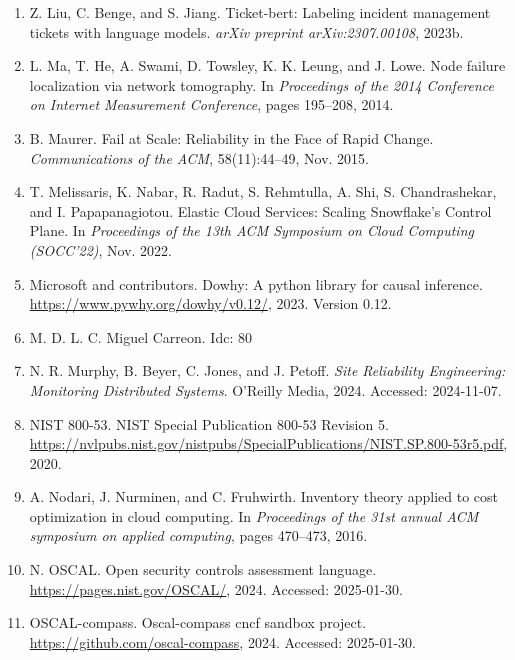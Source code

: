 \begin{enumerate}[leftmargin=2em,itemsep=2pt]
\item Z. Liu, C. Benge, and S. Jiang. Ticket-bert: Labeling incident management tickets with language models. \textit{arXiv preprint arXiv:2307.00108}, 2023b.

\item L. Ma, T. He, A. Swami, D. Towsley, K. K. Leung, and J. Lowe. Node failure localization via network tomography. In \textit{Proceedings of the 2014 Conference on Internet Measurement Conference}, pages 195--208, 2014.

\item B. Maurer. Fail at Scale: Reliability in the Face of Rapid Change. \textit{Communications of the ACM}, 58(11):44--49, Nov. 2015.

\item T. Melissaris, K. Nabar, R. Radut, S. Rehmtulla, A. Shi, S. Chandrashekar, and I. Papapanagiotou. Elastic Cloud Services: Scaling Snowflake's Control Plane. In \textit{Proceedings of the 13th ACM Symposium on Cloud Computing (SOCC'22)}, Nov. 2022.

\item Microsoft and contributors. Dowhy: A python library for causal inference. \url{https://www.pywhy.org/dowhy/v0.12/}, 2023. Version 0.12.

\item M. D. L. C. Miguel Carreon. Idc: 80

\item N. R. Murphy, B. Beyer, C. Jones, and J. Petoff. \textit{Site Reliability Engineering: Monitoring Distributed Systems}. O'Reilly Media, 2024. Accessed: 2024-11-07.

\item NIST 800-53. NIST Special Publication 800-53 Revision 5. \url{https://nvlpubs.nist.gov/nistpubs/SpecialPublications/NIST.SP.800-53r5.pdf}, 2020.

\item A. Nodari, J. Nurminen, and C. Fruhwirth. Inventory theory applied to cost optimization in cloud computing. In \textit{Proceedings of the 31st annual ACM symposium on applied computing}, pages 470--473, 2016.

\item N. OSCAL. Open security controls assessment language. \url{https://pages.nist.gov/OSCAL/}, 2024. Accessed: 2025-01-30.

\item OSCAL-compass. Oscal-compass cncf sandbox project. \url{https://github.com/oscal-compass}, 2024. Accessed: 2025-01-30.


\end{enumerate}
